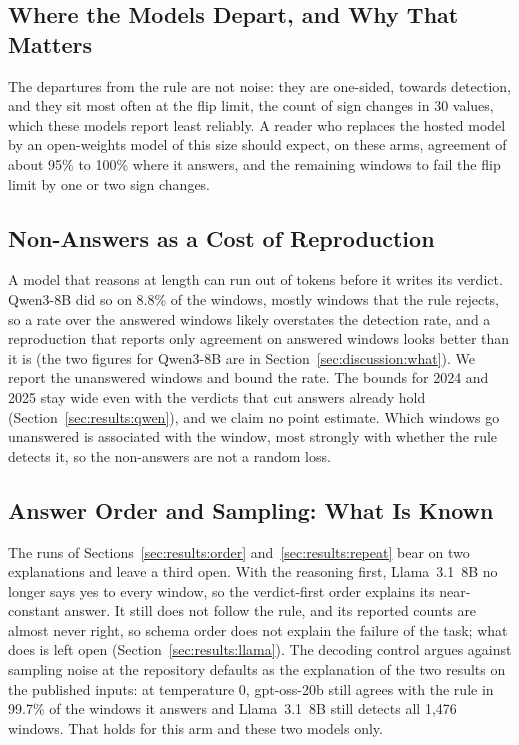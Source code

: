 \subsection{Where the Models Depart, and Why That Matters}
\label{sec:discussion:depart}

The departures from the rule are not noise: they are one-sided, towards detection, and they sit most often at the flip limit, the count of sign changes in 30 values, which these models report least reliably. A reader who replaces the hosted model by an open-weights model of this size should expect, on these arms, agreement of about 95\% to 100\% where it answers, and the remaining windows to fail the flip limit by one or two sign changes.

\subsection{Non-Answers as a Cost of Reproduction}
\label{sec:discussion:nonanswer}

A model that reasons at length can run out of tokens before it writes its verdict. Qwen3-8B did so on 8.8\% of the windows, mostly windows that the rule rejects, so a rate over the answered windows likely overstates the detection rate, and a reproduction that reports only agreement on answered windows looks better than it is (the two figures for Qwen3-8B are in Section~\ref{sec:discussion:what}). We report the unanswered windows and bound the rate. The bounds for 2024 and 2025 stay wide even with the verdicts that cut answers already hold (Section~\ref{sec:results:qwen}), and we claim no point estimate. Which windows go unanswered is associated with the window, most strongly with whether the rule detects it, so the non-answers are not a random loss.

\subsection{Answer Order and Sampling: What Is Known}
\label{sec:discussion:order}

The runs of Sections~\ref{sec:results:order} and~\ref{sec:results:repeat} bear on two explanations and leave a third open. With the reasoning first, Llama~3.1~8B no longer says yes to every window, so the verdict-first order explains its near-constant answer. It still does not follow the rule, and its reported counts are almost never right, so schema order does not explain the failure of the task; what does is left open (Section~\ref{sec:results:llama}). The decoding control argues against sampling noise at the repository defaults as the explanation of the two results on the published inputs: at temperature 0, gpt-oss-20b still agrees with the rule in 99.7\% of the windows it answers and Llama~3.1~8B still detects all 1{,}476 windows. That holds for this arm and these two models only.

